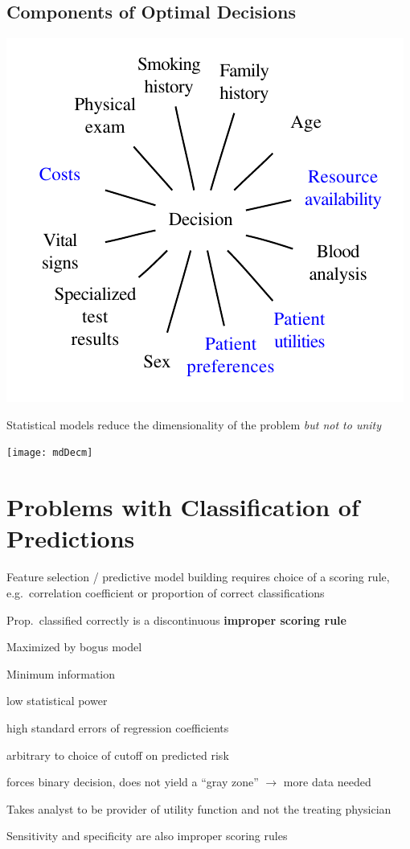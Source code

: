 \subsection{Components of Optimal Decisions}
\centerline{\includegraphics[height=0.4\textheight]{mdDec}}

Statistical models reduce the dimensionality of the problem \emph{but
    not to unity}

\centerline{\texttt{[image: mdDecm]}}

\section{Problems with Classification of Predictions}%
\bi
\item Feature selection / predictive model building requires choice of
a scoring rule, e.g.\ correlation coefficient or proportion of correct
classifications
\item Prop.\ classified correctly is a discontinuous \textbf{improper scoring
    rule}
 \bi
 \item Maximized by bogus model 
 \ei
\item Minimum information
 \bi
 \item low statistical power
 \item high standard errors of regression coefficients
 \item arbitrary to choice of cutoff on predicted risk
 \item forces binary decision, does not yield a ``gray zone''
   $\rightarrow$ more data needed
 \ei
\item Takes analyst to be provider of utility function and not the
 treating physician
\item Sensitivity and specificity are also improper scoring rules
\ei


